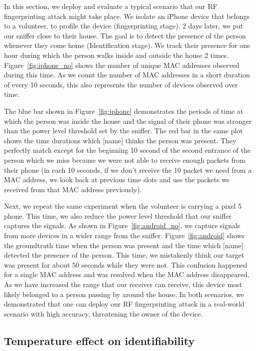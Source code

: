 In this section, we deploy and evaluate a typical scenario that our RF fingerprinting attack might take place. We isolate an iPhone device that belongs to a volunteer, to profile the device (fingerprinting stage). 2 days later, we put our sniffer close to their house. The goal is to detect the presence of the person whenever they come home (Identification stage). We track their presence for one hour during which the person walks inside and outside the house 2 times. Figure~\ref{fig:iphone_no} shows the number of unique MAC addresses observed during this time. As we count the number of MAC addresses in a short duration of every 10 seconds, this also represents the number of devices observed over time. 

The blue bar shown in Figure~\ref{fig:iphone} demonstrates the periods of time at which the person was inside the house and the signal of their phone was stronger than the power level threshold set by the sniffer. The red bar in the same plot shows the time durations which [name] thinks the person was present. They perfectly match except for the beginning 10 second of the second entrance of the person which we miss because we were not able to receive enough packets from their phone (in each 10 seconds, if we don't receive the 10 packet we need from a MAC address, we look back at previous time slots and use the packets we received from that MAC address previously). 

Next, we repeat the same experiment when the volunteer is carrying a pixel 5 phone. This time, we also reduce the power level threshold that our sniffer captures the signals. As shown in Figure~\ref{fig:android_no}, we capture signals from more devices in a wider range from the sniffer. Figure~\ref{fig:android} shows the groundtruth time when the person was present and the time which [name] detected the presence of the person. This time, we mistakenly think our target was present for about 50 seconds while they were not. This confusion happened for a single MAC address and was resolved when the MAC address disappeared. As we have increased the range that our receiver can receive, this device most likely belonged to a person passing by around the house. In both scenarios, we demonstrated that one can deploy our RF fingerprinting attack in a real-world scenario with high accuracy, threatening the owner of the device.


\subsection{Temperature effect on identifiability}
\label{sec:temp}

